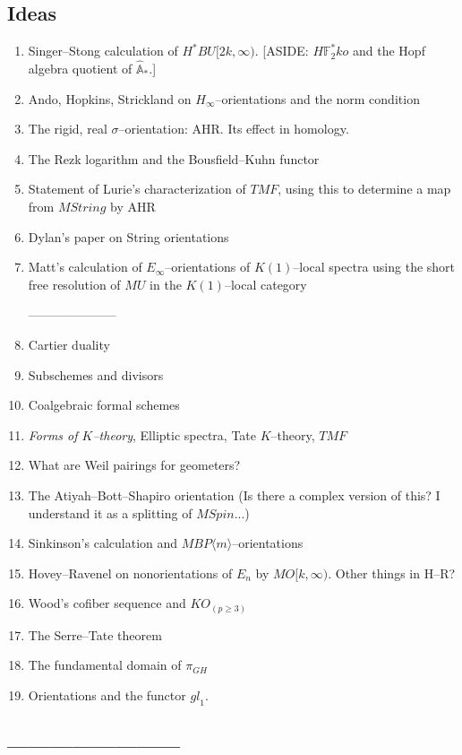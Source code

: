 \documentclass[12pt]{book}
\newcommand{\F}{\mathbb F}
\newcommand{\A}{\widehat{\mathbb{A}}}
\newcommand{\<}{\langle}
\renewcommand{\>}{\rangle}
\newcommand{\Spin}{\mathit{Spin}}
\newcommand{\String}{\mathit{String}}
\newcommand{\TMF}{\mathit{TMF}}
\newcommand{\BP}{\mathit{BP}}
\newcommand{\gl}{\mathit{gl}}
\numberwithin{equation}{section}
\theoremstyle{plain}
\theoremstyle{definition}
\theoremstyle{remark}
\begin{document}
\subsection*{Ideas}
\begin{enumerate}

\item Singer--Stong calculation of $H^* BU[2k, \infty)$. [ASIDE: $H\F_2^* ko$ and the Hopf algebra quotient of $\A_*$.]

\item Ando, Hopkins, Strickland on $H_\infty$--orientations and the norm condition
\item The rigid, real $\sigma$--orientation: AHR. Its effect in homology.
\item The Rezk logarithm and the Bousfield--Kuhn functor
\item Statement of Lurie's characterization of $\TMF$, using this to determine a map from $M\String$ by AHR
\item Dylan's paper on String orientations
\item Matt's calculation of $E_\infty$--orientations of $K(1)$--local spectra using the short free resolution of $MU$ in the $K(1)$--local category

---------------------
\item Cartier duality
\item Subschemes and divisors
\item Coalgebraic formal schemes
\item \textit{Forms of $K$--theory}, Elliptic spectra, Tate $K$--theory, $\TMF$
\item What are Weil pairings for geometers?
\item The Atiyah--Bott--Shapiro orientation (Is there a complex version of this? I understand it as a splitting of $M\Spin$...)
\item Sinkinson's calculation and $M\BP\<m\>$--orientations
\item Hovey--Ravenel on nonorientations of $E_n$ by $MO[k, \infty)$. Other things in H--R?
\item Wood's cofiber sequence and $KO_{(p \ge 3)}$
\item The Serre--Tate theorem
\item The fundamental domain of $\pi_{GH}$
\item Orientations and the functor $\gl_1$.
\end{enumerate}

\subsection*{------------------------}
\end{document}
